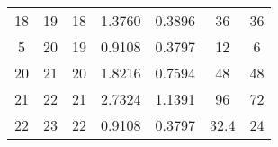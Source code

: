 \begin{table}[]
\begin{tabular}{@{}ccccccc@{}}
18                                                           & 19                                                              & 18                                                   & 1.3760                                                                          & 0.3896                                                                        & 36                                                                              & 36                                                                                   \\
5                                                            & 20                                                              & 19                                                   & 0.9108                                                                          & 0.3797                                                                        & 12                                                                              & 6                                                                                    \\
20                                                           & 21                                                              & 20                                                   & 1.8216                                                                          & 0.7594                                                                        & 48                                                                              & 48                                                                                   \\
21                                                           & 22                                                              & 21                                                   & 2.7324                                                                          & 1.1391                                                                        & 96                                                                              & 72                                                                                   \\
22                                                           & 23                                                              & 22                                                   & 0.9108                                                                          & 0.3797                                                                        & 32.4                                                                            & 24                                                                                   \\

\end{tabular}
\end{table}
